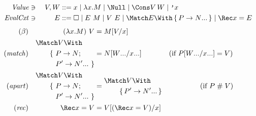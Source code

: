 \begin{figure}[t!]
\centering
  
\begin{alignat*}{2}
  \mathit{Value} &\ni{}& V, W
  &::= x
  \mid \lambda x. M
  \mid \Null
  \mid \Cons V \, W
  \mid \q{x}
  \\
  \mathit{EvalCxt} &\ni{}& E
  &::= \hole
  \mid E ~ M
  \mid V ~ E
  \mid \Match E \With \set{\many{P \to N}}
  \mid \Rec x = E
\end{alignat*}
\begin{align*}
  (\beta)
  &&
  (\lambda x. M) ~ V
  &=
  M\subst{x}{V}
  \\
  (\mathit{match})
  &&
  \begin{aligned}
    &\Match V \With \\
    &\qquad
    \begin{aligned}[t]
    \{~ &P \to N; \\
    &\many{P' \to N'}~\}
    \end{aligned}
  \end{aligned}
  &=
  N\subst{\many{x}}{\many{W}}
  &(\text{if } P\subst{\many{x}}{\many{W}} &= V)
  \\
  (\mathit{apart})
  &&
  \begin{aligned}
    &\Match V \With \\
    &\qquad
    \begin{aligned}[t]
    \{~ &P \to N; \\
    &\many{P' \to N'}~\}
    \end{aligned}
  \end{aligned}
  &=
  \begin{aligned}
    &\Match V \With \\
    &\qquad \set{\many{P' \to N'}}
  \end{aligned}
  &(\text{if } P &\apart V)
  \\
  (\mathit{rec})
  &&
  \Rec x = V
  &=
  V\subst{x}{(\Rec x = V)}
\end{align*}


\end{figure}
